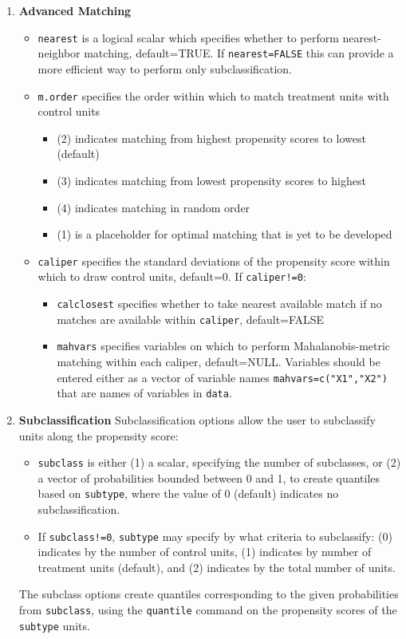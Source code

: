 \documentclass[oneside,letterpaper,titlepage]{article}
\begin{document}
\begin{enumerate}
\item \textbf{Advanced Matching}
  \begin{itemize}
  \item \texttt{nearest} is a logical scalar which specifies whether
    to perform nearest-neighbor matching, default=TRUE.  If
    \texttt{nearest=FALSE} this can provide a more efficient way to
    perform only subclassification. 
  \item \texttt{m.order}  specifies the order within which to match
    treatment units with control units
    \begin{itemize}
    \item (2) indicates matching from highest propensity scores to
      lowest (default)
    \item (3) indicates matching from lowest propensity scores to
      highest
    \item (4) indicates matching in random order
    \item (1) is a placeholder for optimal matching that is yet to be
      developed 
    \end{itemize}
  \item \texttt{caliper} specifies the standard deviations of 
    the propensity score within which to draw control units,
    default=0.  If \texttt{caliper!=0}: 
    \begin{itemize} 
    \item \texttt{calclosest} specifies whether to take nearest
      available match if no matches are available within
      \texttt{caliper}, default=FALSE 
    \item \texttt{mahvars} specifies
      variables on which to perform Mahalanobis-metric matching
      within each caliper, default=NULL.  Variables should be entered
      either as a vector of variable names
      \texttt{mahvars=c("X1","X2")} that are names of variables in
      \texttt{data}. 
    \end{itemize}
  \end{itemize}

\item \textbf{Subclassification}
  Subclassification options allow the user to subclassify units along
  the propensity score:
  \begin{itemize}
  \item \texttt{subclass} is either (1) a scalar, specifying the number of
    subclasses, or (2) a vector of probabilities bounded
    between 0 and 1, to create quantiles based on \texttt{subtype}, where the value of
    0 (default) indicates no subclassification.  
  \item If \texttt{subclass!=0}, \texttt{subtype} may specify by what
    criteria to subclassify: (0) indicates by the number of control
    units, (1) indicates by number of treatment units (default), and
    (2) indicates by the total number of units.  
  \end{itemize}
  The subclass options create quantiles corresponding to the given
  probabilities from \texttt{subclass}, using the \texttt{quantile}
  command on the propensity scores of the \texttt{subtype} units. 
\end{enumerate}
  
\end{document}
